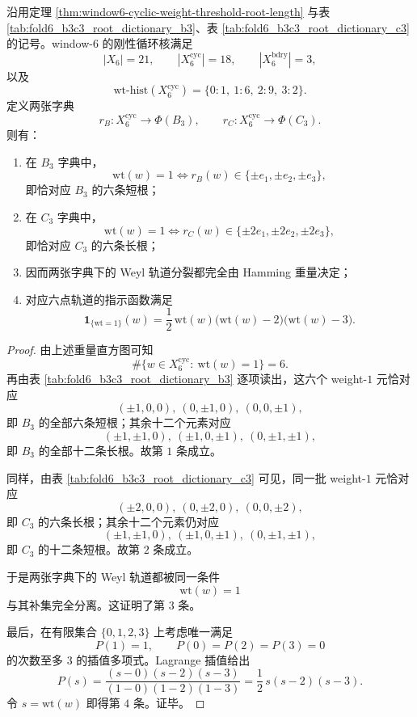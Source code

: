 \begin{theorem}\label{thm:xi-time-part62dea-window6-weight-determines-weyl-orbits}
沿用定理 \ref{thm:window6-cyclic-weight-threshold-root-length} 与表 \ref{tab:fold6_b3c3_root_dictionary_b3}、表 \ref{tab:fold6_b3c3_root_dictionary_c3} 的记号。window-\(6\) 的刚性循环核满足
\[
|X_6|=21,
\qquad
|X_6^{\mathrm{cyc}}|=18,
\qquad
|X_6^{\mathrm{bdry}}|=3,
\]
以及
\[
\mathrm{wt}\text{-hist}(X_6^{\mathrm{cyc}})
=
\{0:1,\ 1:6,\ 2:9,\ 3:2\}.
\]
定义两张字典
\[
r_B:X_6^{\mathrm{cyc}}\to \Phi(B_3),
\qquad
r_C:X_6^{\mathrm{cyc}}\to \Phi(C_3).
\]
则有：
\begin{enumerate}
  \item 在 \(B_3\) 字典中，
  \[
  \mathrm{wt}(w)=1
  \iff
  r_B(w)\in \{\pm e_1,\pm e_2,\pm e_3\},
  \]
  即恰对应 \(B_3\) 的六条短根；
  \item 在 \(C_3\) 字典中，
  \[
  \mathrm{wt}(w)=1
  \iff
  r_C(w)\in \{\pm 2e_1,\pm 2e_2,\pm 2e_3\},
  \]
  即恰对应 \(C_3\) 的六条长根；
  \item 因而两张字典下的 Weyl 轨道分裂都完全由 Hamming 重量决定；
  \item 对应六点轨道的指示函数满足
  \[
  \mathbf 1_{\{\mathrm{wt}=1\}}(w)
  =
  \frac12\,\mathrm{wt}(w)\bigl(\mathrm{wt}(w)-2\bigr)\bigl(\mathrm{wt}(w)-3\bigr).
  \]
\end{enumerate}
\end{theorem}
\begin{proof}
由上述重量直方图可知
\[
\#\{w\in X_6^{\mathrm{cyc}}:\ \mathrm{wt}(w)=1\}=6.
\]
再由表 \ref{tab:fold6_b3c3_root_dictionary_b3} 逐项读出，这六个 weight-\(1\) 元恰对应
\[
(\pm1,0,0),\ (0,\pm1,0),\ (0,0,\pm1),
\]
即 \(B_3\) 的全部六条短根；其余十二个元素对应
\[
(\pm1,\pm1,0),\ (\pm1,0,\pm1),\ (0,\pm1,\pm1),
\]
即 \(B_3\) 的全部十二条长根。故第 \(1\) 条成立。

同样，由表 \ref{tab:fold6_b3c3_root_dictionary_c3} 可见，同一批 weight-\(1\) 元恰对应
\[
(\pm2,0,0),\ (0,\pm2,0),\ (0,0,\pm2),
\]
即 \(C_3\) 的六条长根；其余十二个元素仍对应
\[
(\pm1,\pm1,0),\ (\pm1,0,\pm1),\ (0,\pm1,\pm1),
\]
即 \(C_3\) 的十二条短根。故第 \(2\) 条成立。

于是两张字典下的 Weyl 轨道都被同一条件
\[
\mathrm{wt}(w)=1
\]
与其补集完全分离。这证明了第 \(3\) 条。

最后，在有限集合 \(\{0,1,2,3\}\) 上考虑唯一满足
\[
P(1)=1,
\qquad
P(0)=P(2)=P(3)=0
\]
的次数至多 \(3\) 的插值多项式。Lagrange 插值给出
\[
P(s)=\frac{(s-0)(s-2)(s-3)}{(1-0)(1-2)(1-3)}
=
\frac12\,s(s-2)(s-3).
\]
令 \(s=\mathrm{wt}(w)\) 即得第 \(4\) 条。证毕。
\end{proof}

